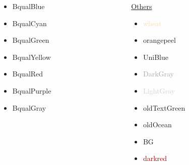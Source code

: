 \documentclass[aspectratio=169,11pt]{beamer}
\begin{document}
\begin{frame}{\insertsection}
\begin{columns}[t]
\begin{column}{0.24\textwidth}
\begin{itemize}
            \item \textcolor{BqualBlue}{BqualBlue}
            \item \textcolor{BqualCyan}{BqualCyan}
            \item \textcolor{BqualGreen}{BqualGreen}
            \item \textcolor{BqualYellow}{BqualYellow}
            \item \textcolor{BqualRed}{BqualRed}
            \item \textcolor{BqualPurple}{BqualPurple}
            \item \textcolor{BqualGrey}{BqualGray}
            \end{itemize}
        \end{column}
        \begin{column}{0.24\textwidth}
            \underline{Others}
            \begin{itemize}
            \item \textcolor{wheat}{wheat}
            \item \textcolor{orangepeel}{orangepeel}
            \item \textcolor{UniBlue}{UniBlue}
            \item \textcolor{DarkGray}{DarkGray}
            \item \textcolor{LightGray}{LightGray}
            \item \textcolor{oldTextGreen}{oldTextGreen}
            \item \textcolor{oldOcean}{oldOcean}
            \item \textcolor{BG}{BG}
            \item \textcolor{darkred}{darkred}
            \end{itemize}
        \end{column}
    \end{columns}
\end{frame}
\end{document}
